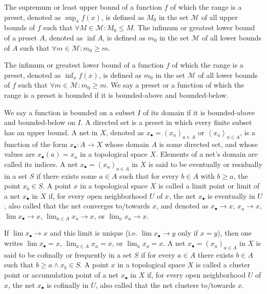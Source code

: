 \documentclass[a4paper,12pt]{article}
\begin{document}
The supremum or least upper bound of a function $f$ of which the range is a preset, denoted as $\sup_xf(x)$, is defined as $M_0$ in the set $\mathcal{M}$ of all upper bounds of $f$ such that $\forall M\in\mathcal{M}\colon M_0\leq M$.
The infimum or greatest lower bound of a preset $A$, denoted as $\inf A$, is defined as $m_0$ in the set $\mathcal{M}$ of all lower bounds of $A$ such that $\forall m\in\mathcal{M}\colon m_0\geq m$.

The infimum or greatest lower bound of a function $f$ of which the range is a preset, denoted as $\inf_xf(x)$, is defined as $m_0$ in the set $\mathcal{M}$ of all lower bounds of $f$ such that $\forall m\in\mathcal{M}\colon m_0\geq m$.
We say a preset or a function of which the range is a preset is bounded if it is bounded-above and bounded-below.

We say a function is bounded on a subset $I$ of its domain if it is bounded-above and bounded-below on $I$.
A directed set is a preset in which every finite subset has an upper bound.
A net in $X$, denoted as $x_{\bullet }=\left(x_{a}\right)_{a\in A}$ or $\left\langle x_{a}\right\rangle _{a\in A}$, is a function of the form $x_{\bullet }\colon A\to X$ whose domain $A$ is some directed set, and whose values are $x_{\bullet }(a)=x_{a}$ in a topological space $X$. Elements of a net's domain are called its indices.
A net $x_{\bullet }=\left(x_{a}\right)_{a\in A}$ in $X$ is said to be eventually or residually in a set $S$ if there exists some $a\in A$ such that for every $b\in A$ with $b\geq a$, the point $x_b\in S$.
A point $x$ in a topological space $X$ is called a limit point or limit of a net $x_{\bullet }$ in $X$ if, for every open neighborhood $U$ of $x$, the net $x_{\bullet }$ is eventually in $U$, also called that the net converges to/towards $x$, and denoted as $x_{\bullet}\to x$, $x_a\to x$, $\lim x_{\bullet}\to x$, $\lim_{a\in A}x_a\to x$, or $\lim_ax_a\to x$.

If $\lim x_{\bullet}\to x$ and this limit is unique (i.e. $\lim x_{\bullet}\to y$ only if $x=y$), then one writes $\lim x_{\bullet}=x$, $\lim_{a\in A}x_a=x$, or $\lim_ax_a=x$.
A net $x_{\bullet }=\left(x_{a}\right)_{a\in A}$ in $X$ is said to be cofinally or frequently in a set $S$ if for every $a\in A$ there exists $b\in A$ such that $b\geq a\land x_b\in S$.
A point $x$ in a topological space $X$ is called a cluster point or accumulation point of a net $x_{\bullet }$ in $X$ if, for every open neighborhood $U$ of $x$, the net $x_{\bullet }$ is cofinally in $U$, also called that the net clusters to/towards $x$.
\end{document}
